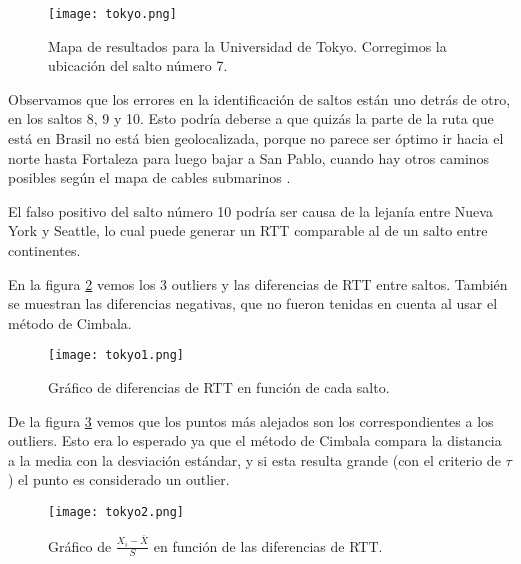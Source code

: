 \begin{figure}[H]
\texttt{[image: tokyo.png]}
\caption{Mapa de resultados para la Universidad de Tokyo. Corregimos la ubicación del salto número 7.}
\label{mapa1}
\end{figure}

Observamos que los errores en la identificación de saltos están uno detrás de otro, en los saltos 8, 9 y 10. Esto podría deberse a que quizás la parte de la ruta que está en Brasil no está bien geolocalizada, porque no parece ser óptimo ir hacia el norte hasta Fortaleza para luego bajar a San Pablo, cuando hay otros caminos posibles según el mapa de cables submarinos \cite{cables}.

El falso positivo del salto número 10 podría ser causa de la lejanía entre Nueva York y Seattle, lo cual puede generar un RTT comparable al de un salto entre continentes.

En la figura \ref{diff1} vemos los 3 outliers y las diferencias de RTT entre saltos. También se muestran las diferencias negativas, que no fueron tenidas en cuenta al usar el método de Cimbala.

\begin{figure}[H]
\centering
\texttt{[image: tokyo1.png]}
\caption{Gráfico de diferencias de RTT en función de cada salto.}
\label{diff1}
\end{figure}

De la figura \ref{sdev1} vemos que los puntos más alejados son los correspondientes a los outliers. Esto era lo esperado ya que el método de Cimbala compara la distancia a la media con la desviación estándar, y si esta resulta grande (con el criterio de $\tau$) el punto es considerado un outlier.

\begin{figure}[H]
\centering
\texttt{[image: tokyo2.png]}
\caption{Gráfico de $\frac{X_i - \bar{X}}{S}$ en función de las diferencias de RTT.}
\label{sdev1}
\end{figure}